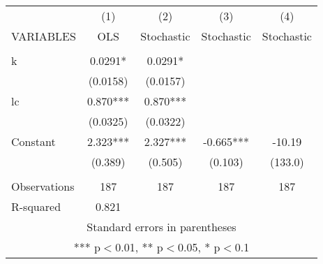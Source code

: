 \documentclass[]{article}
\begin{document}
\begin{tabular}{lcccc} \hline
 & (1) & (2) & (3) & (4) \\
VARIABLES & OLS & Stochastic & Stochastic & Stochastic \\ \hline
 &  &  &  &  \\
k & 0.0291* & 0.0291* &  &  \\
 & (0.0158) & (0.0157) &  &  \\
lc & 0.870*** & 0.870*** &  &  \\
 & (0.0325) & (0.0322) &  &  \\
Constant & 2.323*** & 2.327*** & -0.665*** & -10.19 \\
 & (0.389) & (0.505) & (0.103) & (133.0) \\
 &  &  &  &  \\
Observations & 187 & 187 & 187 & 187 \\
 R-squared & 0.821 &  &  &  \\ \hline
\multicolumn{5}{c}{ Standard errors in parentheses} \\
\multicolumn{5}{c}{ *** p$<$0.01, ** p$<$0.05, * p$<$0.1} \\
\end{tabular}
\end{document}

